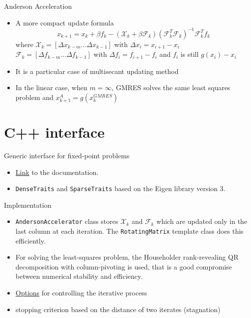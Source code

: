 \documentclass{beamer}
\begin{document}
				\begin{frame}{Anderson Acceleration}
					\begin{itemize}
						\item A more compact update formula
						\begin{equation*}
							x_{k+1}=x_{k} + \beta f_k -(\mathscr{X}_k + \beta \mathscr{F}_k)(\mathscr{F}_k^T \mathscr{F}_k)^{-1}\mathscr{F}_k^T f_k
						\end{equation*}
						where
						$\mathscr{X}_k=[\Delta x_{k-m}...\Delta x_{k-1}]$ with $\Delta x_{i}=x_{i+1}-x_i$  
						$\mathscr{F}_k=[\Delta f_{k-m}...\Delta f_{k-1}]$ with $\Delta f_{i}=f_{i+1}-f_i$ and $f_i$ is still $g(x_i)-x_{i}$
						\item It is a particular case of multisecant updating method \cite{Fang}
						\item In the linear case, when $m = \infty$, GMRES solves the same least squares problem and $x_{k+1}^A = g(x_k^{GMRES})$
					\end{itemize}
				\end{frame}
					
				\section{C++ interface}
				
				\begin{frame}{Generic interface for fixed-point problems}
				\begin{itemize}
					\item	\href{file:///D:/VM/progetto/src/html/index.html}{Link} to the documentation.
					\item \texttt{DenseTraits} and \texttt{SparseTraits} based on the Eigen library version 3.
				\end{itemize}
				\end{frame}
				
				
				\begin{frame}{Implementation}
				\begin{itemize}
				\item \texttt{AndersonAccelerator} class stores
				$\mathscr{X}_k$ and $\mathscr{F}_k$ which are updated 
				only in the last column at each iteration. The \texttt{RotatingMatrix}
				template class does this efficiently.
				\item For solving the least-squares problem, the Householder rank-revealing
				QR decomposition with column-pivoting is used, that is a good compromise
				between numerical stability and efficiency.
				\item \href{file:///D:/VM/progetto/src/html/structFixedPoint_1_1FixedPointOptions.html}{Options}
				for controlling the iterative process
				\item stopping criterion based on the distance of two iterates (stagnation)
				\end{itemize}
				\end{frame}
\end{document}
